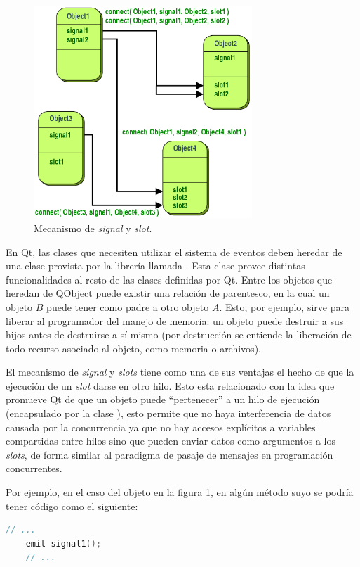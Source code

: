 \begin{figure}[!ht]
	\centering
	\includegraphics[height=8cm]{imagenes/signal-slots.png}
	\caption{Mecanismo de \emph{signal} y \emph{slot}.}
	\label{fig:signals-slots}
\end{figure}

En Qt, las clases que necesiten utilizar el sistema de eventos deben heredar de una clase provista por la librería llamada . Esta clase provee distintas funcionalidades al resto de las clases definidas por Qt. Entre los objetos que heredan de QObject puede existir una relación de parentesco, en la cual un objeto $B$ puede tener como padre a otro objeto $A$. Esto, por ejemplo, sirve para liberar al programador del manejo de memoria: un objeto puede destruir a sus hijos antes de destruirse a sí mismo (por destrucción se entiende la liberación de todo recurso asociado al objeto, como memoria o archivos).

El mecanismo de \emph{signal} y \emph{slots} tiene como una de sus ventajas el hecho de que la ejecución de un \emph{slot} darse en otro hilo. Esto esta relacionado con la idea que promueve Qt de que un objeto puede \enquote{pertenecer} a un hilo de ejecución (encapsulado por la clase ), esto permite que no haya interferencia de datos causada por la concurrencia ya que no hay accesos explícitos a variables compartidas entre hilos sino que pueden enviar datos como argumentos a los \emph{slots}, de forma similar al paradigma de pasaje de mensajes en programación concurrentes.

Por ejemplo, en el caso del objeto  en la figura \ref{fig:signals-slots}, en algún método suyo se podría tener código como el siguiente:
\begin{lstlisting}[language=c++]
	// ...
	emit signal1();
	// ...
\end{lstlisting}


